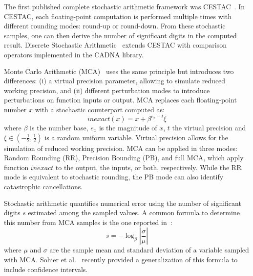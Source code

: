 \documentclass[11pt]{article}
\newcommand{\tristan}[1]{\color{orange}\textbf{From Tristan:} #1\color{black}\xspace}
\begin{document}
The first published complete stochastic arithmetic framework was CESTAC~\cite{vignes1993stochastic}. In CESTAC, each floating-point computation is performed multiple times with different rounding modes: round-up or round-down. From these stochastic samples, one can then derive the number of significant digits in the computed result. Discrete Stochastic Arithmetic~\cite{vignes2004discrete} extends CESTAC with comparison operators implemented in the CADNA library.

Monte Carlo Arithmetic (MCA)~\cite{parker1997monte} uses the same principle but introduces two differences:
(i) a virtual precision parameter, allowing to simulate reduced working precision,  and (ii) different perturbation modes to introduce perturbations
on function inputs or output.
MCA replaces each floating-point number $x$ with a stochastic counterpart computed as:
\[
inexact(x) =  x + \beta^{e_x - t}\xi
\]
where $\beta$ is the number base, $e_x$ is the magnitude of $x$, $t$ the virtual precision and $\xi \in (-\frac{1}{2},\frac{1}{2})$ is a random uniform variable.
Virtual precision allows for the simulation of reduced working precision.
MCA can be applied in three modes: Random Rounding (RR), Precision Bounding (PB), and full MCA, which apply function $inexact$ to the output, the inputs, or both, respectively. While the RR mode is equivalent to stochastic rounding, the PB mode can also identify catastrophic cancellations.

Stochastic arithmetic quantifies numerical error using the number of significant digits $s$ estimated among the sampled values. A common formula to determine this number from MCA samples is the one reported in~\cite{parker1997monte}:
\begin{equation}
s = -\log_{\beta}{ \left| \dfrac{\sigma}{\mu} \right|} \label{eq:sig-digits}
\end{equation}
where $\mu$ and $\sigma$ are the sample mean and standard deviation of a variable sampled with MCA.  
Sohier et al.~\cite{sohier2018confidence} recently provided a generalization of this formula to include confidence intervals.

\end{document}
